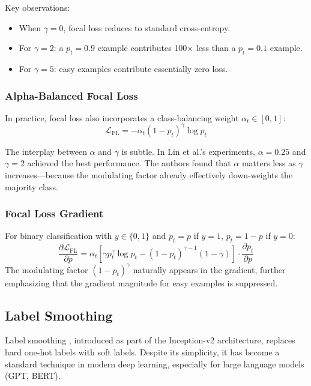Key observations:
\begin{itemize}
    \item When $\gamma = 0$, focal loss reduces to standard cross-entropy.
    \item For $\gamma = 2$: a $p_t = 0.9$ example contributes 100$\times$ less than a $p_t = 0.1$ example.
    \item For $\gamma = 5$: easy examples contribute essentially zero loss.
\end{itemize}

\subsubsection{Alpha-Balanced Focal Loss}

In practice, focal loss also incorporates a class-balancing weight $\alpha_t \in [0, 1]$:
\begin{equation}
\mathcal{L}_{\text{FL}} = -\alpha_t (1 - p_t)^\gamma \log p_t
\end{equation}

The interplay between $\alpha$ and $\gamma$ is subtle. In Lin et al.'s experiments, $\alpha = 0.25$ and $\gamma = 2$ achieved the best performance. The authors found that $\alpha$ matters less as $\gamma$ increases---because the modulating factor already effectively down-weights the majority class.

\subsubsection{Focal Loss Gradient}

For binary classification with $y \in \{0, 1\}$ and $p_t = p$ if $y = 1$, $p_t = 1 - p$ if $y = 0$:
\begin{equation}
\frac{\partial \mathcal{L}_{\text{FL}}}{\partial p} = \alpha_t \left[\gamma p_t^\gamma \log p_t - (1 - p_t)^{\gamma - 1}(1 - \gamma)\right] \cdot \frac{\partial p_t}{\partial p}
\end{equation}
The modulating factor $(1 - p_t)^\gamma$ naturally appears in the gradient, further emphasizing that the gradient magnitude for easy examples is suppressed.

\subsection{Label Smoothing}

Label smoothing \cite{szegedy2016rethinking}, introduced as part of the Inception-v2 architecture, replaces hard one-hot labels with soft labels. Despite its simplicity, it has become a standard technique in modern deep learning, especially for large language models (GPT, BERT).

